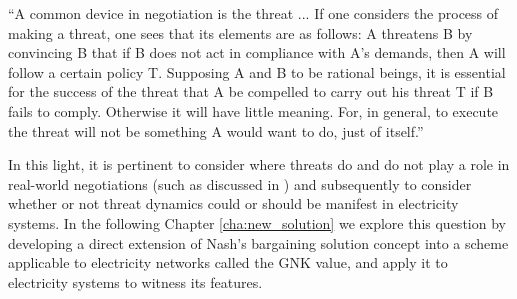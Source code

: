 \begin{displayquote}
``A common device in negotiation is the threat ... If one considers the process of making a threat, one sees that its elements are as follows: A threatens B by convincing B that if B does not act in compliance with A's demands, then A will follow a certain policy T. Supposing A and B to be rational beings, it is essential for the success of the threat that A be compelled to carry out his threat T if B fails to comply. Otherwise it will have little meaning. For, in general, to execute the threat will not be something A would want to do, just of itself.''
\citep{nash2}
\end{displayquote}

In this light, it is pertinent to consider where threats do and do not play a role in real-world negotiations (such as discussed in \cite{anbarci2002comparing}) and subsequently to consider whether or not threat dynamics could or should be manifest in electricity systems.
In the following Chapter \ref{cha:new_solution} we explore this question by developing a direct extension of Nash's bargaining solution concept into a scheme applicable to electricity networks called the GNK value, and apply it to electricity systems to witness its features.%





\DIFaddbegin \section{}\label{sec:envy_free_systems}\label{sec:envy_free_solutions}




